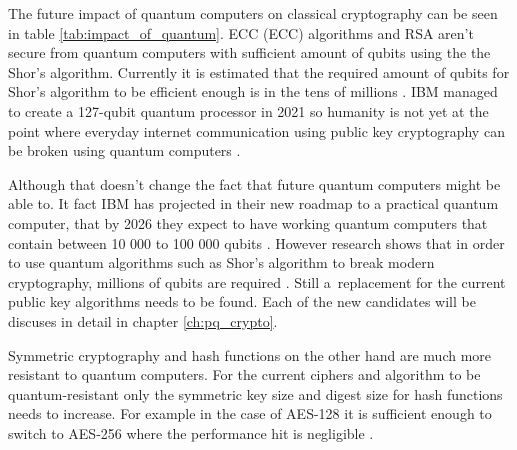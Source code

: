 The future impact of quantum computers on classical cryptography can be seen in table \ref{tab:impact_of_quantum}. ECC (\acl{ECC}) algorithms and RSA aren't secure from quantum computers with sufficient amount of qubits using the the Shor's algorithm. Currently it is estimated that the required amount of qubits for Shor's algorithm to be efficient enough is in the tens of millions \cite{Bernstein149}\cite{Mosca2015}. IBM managed to create a 127-qubit quantum processor in 2021 so humanity is not yet at the point where everyday internet communication using public key cryptography can be broken using quantum computers \cite{0MBNdFRCTLK35MFY}. 

Although that doesn't change the fact that future quantum computers might be able to. It fact IBM has projected in their new roadmap to a practical quantum computer, that by 2026 they expect to have working quantum computers that contain between 10 000 to 100 000 qubits \cite{Gambetta2021}. However research shows that in order to use quantum algorithms such as Shor's algorithm to break modern cryptography, millions of qubits are required \cite{Bernstein149}. Still a~replacement for the current public key algorithms needs to be found. Each of the new candidates will be discuses in detail in chapter \ref{ch:pq_crypto}.

Symmetric cryptography and hash functions on the other hand are much more resistant to quantum computers. For the current ciphers and algorithm to be quantum-resistant only the symmetric key size and digest size for hash functions needs to increase. For example in the case of AES-128 it is sufficient enough to switch to AES-256 where the performance hit is negligible \cite{Bernstein149}.

